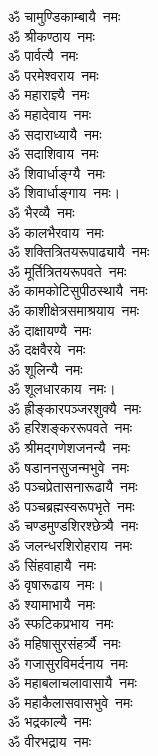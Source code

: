 \begin{multicols}{2}
\begin{flushleft}
ॐ चामुण्डिकाम्बायै~नमः\\
ॐ श्रीकण्ठाय~नमः\\
ॐ पार्वत्यै~नमः\\
ॐ परमेश्वराय~नमः\\
ॐ महाराज्ञ्यै~नमः\\
ॐ महादेवाय~नमः\\
ॐ सदाराध्यायै~नमः\\
ॐ सदाशिवाय~नमः\\
ॐ शिवार्धाङ्ग्यै~नमः\\
ॐ शिवार्धाङ्गाय~नमः।\hfill{}\\
ॐ भैरव्यै~नमः\\
ॐ कालभैरवाय~नमः\\
ॐ शक्तित्रितयरूपाढ्यायै~नमः\\
ॐ मूर्तित्रितयरूपवते~नमः\\
ॐ कामकोटिसुपीठस्थायै~नमः\\
ॐ काशीक्षेत्रसमाश्रयाय~नमः\\
ॐ दाक्षायण्यै~नमः\\
ॐ दक्षवैरये~नमः\\
ॐ शूलिन्यै~नमः\\
ॐ शूलधारकाय~नमः।\hfill{}\\
ॐ ह्रीङ्कारपञ्जरशुक्यै~नमः\\
ॐ हरिशङ्कररूपवते~नमः\\
ॐ श्रीमद्गणेशजनन्यै~नमः\\
ॐ षडाननसुजन्मभुवे~नमः\\
ॐ पञ्चप्रेतासनारूढायै~नमः\\
ॐ पञ्चब्रह्मस्वरूपभृते~नमः\\
ॐ चण्डमुण्डशिरश्छेत्र्यै~नमः\\
ॐ जलन्धरशिरोहराय~नमः\\
ॐ सिंहवाहायै~नमः\\
ॐ वृषारूढाय~नमः।\hfill{}\\
ॐ श्यामाभायै~नमः\\
ॐ स्फटिकप्रभाय~नमः\\
ॐ महिषासुरसंहर्त्र्यै~नमः\\
ॐ गजासुरविमर्दनाय~नमः\\
ॐ महाबलाचलावासायै~नमः\\
ॐ महाकैलासवासभुवे~नमः\\
ॐ भद्रकाल्यै~नमः\\
ॐ वीरभद्राय~नमः\\

\end{flushleft}
\end{multicols}
